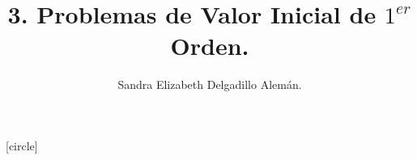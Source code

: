 
\title{3. Problemas de Valor Inicial de \(1^{er}\) Orden.}
\author{Sandra Elizabeth Delgadillo Alemán.}

[circle] %

\newcommand\Myref[1]{
  \begingroup
  \usebeamerfont*{item projected}%
  \usebeamercolor[bg]{item projected}%
  \begin{pgfpicture}{-1ex}{0ex}{1ex}{2ex}
    \pgfpathcircle{\pgfpoint{0pt}{.75ex}}{1.2ex}
    \pgfusepath{fill}
    \pgftext[base]{\color{fg}\ref{#1}}
  \end{pgfpicture}%
  \endgroup
}
